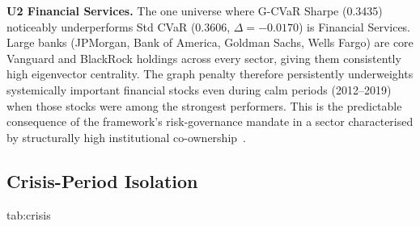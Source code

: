 \textbf{U2 Financial Services.}
The one universe where G-CVaR Sharpe (0.3435) noticeably underperforms
Std CVaR (0.3606, $\Delta = -0.0170$) is Financial Services. Large banks
(JPMorgan, Bank of America, Goldman Sachs, Wells Fargo) are core Vanguard
and BlackRock holdings across every sector, giving them consistently high
eigenvector centrality. The graph penalty therefore persistently
underweights systemically important financial stocks even during calm
periods (2012--2019) when those stocks were among the strongest performers.
This is the predictable consequence of the framework's risk-governance
mandate in a sector characterised by structurally high institutional
co-ownership~\citep{azar2018,billio2012}.

\subsection{Crisis-Period Isolation}

  {tab:crisis}
  {}

